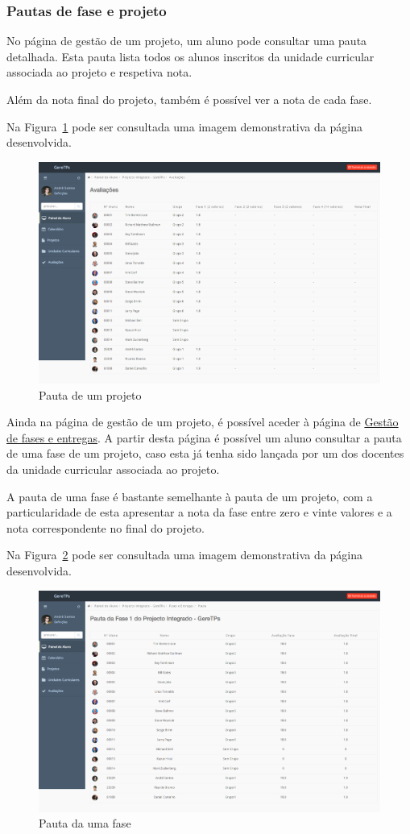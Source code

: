 \subsubsection{Pautas de fase e projeto}

No página de gestão de um projeto, um aluno pode consultar uma pauta detalhada. Esta pauta lista todos os alunos inscritos da unidade curricular associada ao projeto e respetiva nota.

Além da nota final do projeto, também é possível ver a nota de cada fase.

Na Figura~\ref{fig:student_grades_project} pode ser consultada uma imagem demonstrativa da página desenvolvida.

\begin{figure}[H]
	\centering
	\includegraphics[width=1\textwidth,center]{images/implementacao/alunos/grades_project}
	\caption{Pauta de um projeto}
	\label{fig:student_grades_project}
\end{figure}

Ainda na página de gestão de um projeto, é possível aceder à página de \hyperref[ssub:gestao_fases]{Gestão de fases e entregas}. A partir desta página é possível um aluno consultar a pauta de uma fase de um projeto, caso esta já tenha sido lançada por um dos docentes da unidade curricular associada ao projeto.

A pauta de uma fase é bastante semelhante à pauta de um projeto, com a particularidade de esta apresentar a nota da fase entre zero e vinte valores e a nota correspondente no final do projeto.

Na Figura~\ref{fig:student_grades_phase} pode ser consultada uma imagem demonstrativa da página desenvolvida.

\begin{figure}[H]
	\centering
	\includegraphics[width=1\textwidth,center]{images/implementacao/alunos/grades_phase}
	\caption{Pauta da uma fase}
	\label{fig:student_grades_phase}
\end{figure}
